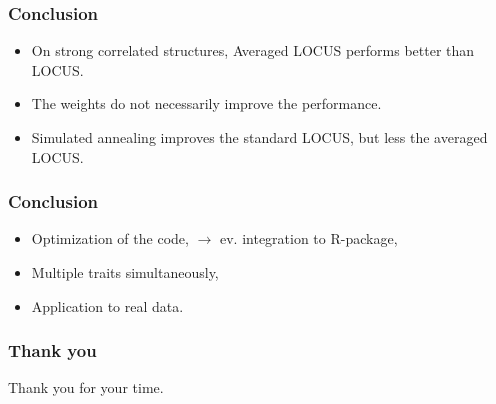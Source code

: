 \documentclass{beamer}
\begin{document}
\begin{frame}
\frametitle{Conclusion}
\begin{itemize}
\item On strong correlated structures, Averaged LOCUS performs better than LOCUS.
\item The weights do not necessarily improve the performance.
\item Simulated annealing improves the standard LOCUS, but less the averaged LOCUS.
\end{itemize}
\end{frame}

\begin{frame}
\frametitle{Conclusion}
\begin{itemize}
\item Optimization of the code, $\rightarrow$ ev. integration to R-package,
\item Multiple traits simultaneously,
\item Application to real data.

\end{itemize}
\end{frame}

\begin{frame}
\frametitle{Thank you}
Thank you for your time.
\end{frame}
\end{document}
